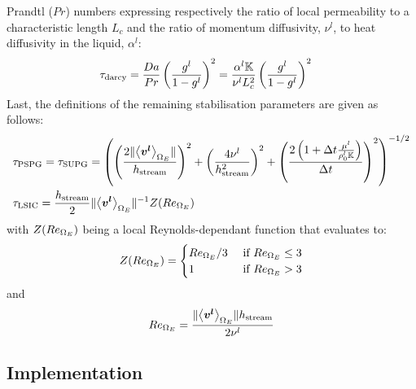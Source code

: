Prandtl ($Pr$) numbers expressing respectively the ratio of local permeability to a characteristic length $L_c$ and the ratio of
momentum diffusivity, $\nu^l$, to heat diffusivity in the liquid, $\alpha^l$:
\begin{align}
\label{eq:supg_darcy}
& \tau_\text{darcy} = \frac{Da}{Pr} \left( \frac{{g^l}}{1-{g^l}} \right)^2= \frac{\alpha^l \mathbb{K}}{\nu^l L_c^2} \left( \frac{{g^l}}{1-{g^l}} \right)^2
\end{align}
Last, the definitions of the remaining stabilisation parameters are given as follows:
\begin{align}
\label{eq:pspg}
& \tau_\text{PSPG} = \tau_\text{SUPG} =
	\left(  
	\left( \frac{2 \lVert \left \langle \boldsymbol{v^l} \right \rangle_{\Omega_E} \rVert}{h_\text{stream}} \right)^2
   + \left( \frac{4\nu^l}{h_\text{stream}^2} \right)^2
   + \left( \frac{2\left( 1+\Delta t \frac{\mu^l}{\rho_{0}^{l} \mathbb{K}} \right)}{\Delta t} \right)^2  \right)^{-1/2} \\
& \tau_\text{LSIC} = \frac{h_\text{stream}}{2} \lVert \left \langle \boldsymbol{v^l} \right \rangle_{\Omega_E} \rVert^{-1} Z(Re_{\Omega_E})  
\end{align}
with $Z(Re_{\Omega_E})$ being a local Reynolds-dependant function that evaluates to:
\begin{align}
\label{eq:lsic}
Z(Re_{\Omega_E}) = 
\begin{cases}
  Re_{\Omega_E}/3		& \text{ if } Re_{\Omega_E} \leq 3 \\ 
  1					& \text{ if } Re_{\Omega_E} > 3
\end{cases}
\end{align}
and
\begin{align}
Re_{\Omega_E} = \frac{\lVert \left \langle \boldsymbol{v^l} \right \rangle_{\Omega_E} \rVert h_\text{stream}}{2 \nu^l}
\end{align}
\subsection{Implementation}
%

